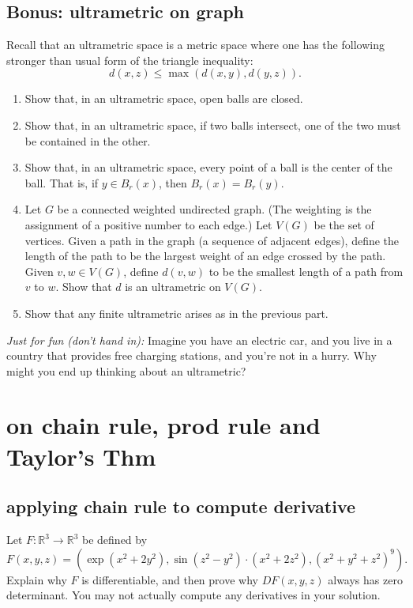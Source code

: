 \documentclass[lang=cn,11pt]{template}
\begin{document}
\section{Bonus: ultrametric on graph}
Recall that an ultrametric space is a metric space where one has the following stronger than usual form of the triangle inequality:
\[
d(x, z) \leq \max(d(x, y), d(y, z)).
\]
\begin{enumerate}
    \item Show that, in an ultrametric space, open balls are closed.
    \item Show that, in an ultrametric space, if two balls intersect, one of the two must be contained in the other.
    \item Show that, in an ultrametric space, every point of a ball is the center of the ball. That is, if \( y \in B_r(x) \), then \( B_r(x) = B_r(y) \).
    \item Let \( G \) be a connected weighted undirected graph. (The weighting is the assignment of a positive number to each edge.) Let \( V(G) \) be the set of vertices. Given a path in the graph (a sequence of adjacent edges), define the length of the path to be the largest weight of an edge crossed by the path. Given \( v, w \in V(G) \), define \( d(v, w) \) to be the smallest length of a path from \( v \) to \( w \). Show that \( d \) is an ultrametric on \( V(G) \).
    \item Show that any finite ultrametric arises as in the previous part.
\end{enumerate}

\textit{Just for fun (don’t hand in):} Imagine you have an electric car, and you live in a country that provides free charging stations, and you’re not in a hurry. Why might you end up thinking about an ultrametric?





\chapter{on chain rule, prod rule and Taylor's Thm}

\section{applying chain rule to compute derivative}
Let $F : \mathbb{R}^3 \to \mathbb{R}^3$ be defined by
\[
F(x, y, z) = (\exp(x^2 + 2y^2), \sin(z^2 - y^2) \cdot (x^2 + 2z^2), (x^2 + y^2 + z^2)^9).
\]
Explain why $F$ is differentiable, and then prove why $DF(x, y, z)$ always has zero determinant. You may not actually compute any derivatives in your solution.
\end{document}
